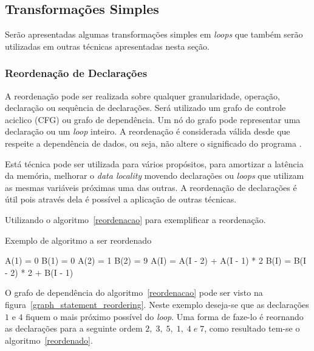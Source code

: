 
\subsection{Transformações Simples}

Serão apresentadas algumas transformações simples em \textit{loops} que também
serão utilizadas em outras técnicas apresentadas nesta seção.

\subsubsection{Reordenação de Declarações}

A reordenação pode ser realizada sobre qualquer granularidade, operação,
declaração ou sequência de declarações. 
Será utilizado um grafo de controle aciclico (CFG) ou grafo de dependência.
Um nó do grafo pode representar uma declaração ou um \textit{loop} inteiro.
A reordenação é considerada válida desde que respeite a dependência de dados, 
ou seja, não altere o significado do programa \cite[9.1]{hpcfpc}.

Está técnica pode ser utilizada para vários propósitos, para 
amortizar a latência da memória, melhorar o \textit{data locality} movendo 
declarações ou \textit{loops} que utilizam as mesmas variáveis próximas uma das 
outras. 
A reordenação de declarações é útil pois através dela é possível 
a aplicação de outras técnicas. 

Utilizando o algoritmo~\ref{reordenacao} para exemplificar a reordenação. 

\begin{algorithm}
\caption{Exemplo de algoritmo a ser reordenado}
\label{reordenacao}
\begin{algorithmic}[1]

\STATE A(1) = 0
\STATE B(1) = 0
\STATE A(2) = 1
\STATE B(2) = 9
\ENDIF
{}
\STATE A(I) = A(I - 2) + A(I - 1) * 2
\STATE B(I) = B(I - 2) * 2 + B(I - 1) 
\ENDFOR

\end{algorithmic}
\end{algorithm}

O grafo de dependência do algoritmo~\ref{reordenacao} pode ser visto na 
figura~\ref{graph_statement_reordering}. 
Neste exemplo deseja-se que as declarações $1$ e $4$ fiquem o mais próximo 
possível do \textit{loop}. 
Uma forma de faze-lo é reornando as declarações para a seguinte ordem $2,\; 3,\; 5,
\;1,\; 4\; e\; 7$, como resultado tem-se o algoritmo~\ref{reordenado}.



